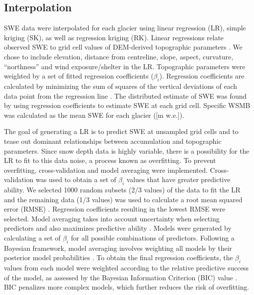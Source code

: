 \documentclass[twocolumn,letterpaper]{igs}
\begin{document}
\subsection{Interpolation}

SWE data were interpolated for each glacier using linear regression (LR), simple kriging (SK), as well as regression kriging (RK). Linear regressions relate observed SWE to grid cell values of DEM-derived topographic parameters \citep{Davis1986}. We chose to include elevation, distance from centreline, slope, aspect, curvature, ``northness'' and wind exposure/shelter in the LR. Topographic parameters were weighted by a set of fitted regression coefficients ($\beta_i$). Regression coefficients are calculated by minimizing the sum of squares of the vertical deviations of each data point from the regression line \citep{Davis1986}. The distributed estimate of SWE was found by using regression coefficients to estimate SWE at each grid cell. Specific WSMB was calculated as the mean SWE for each glacier ([m w.e.]). 

The goal of generating a LR is to predict SWE at unsampled grid cells and to tease out dominant relationships between accumulation and topographic parameters. Since snow depth data is highly variable, there is a possibility for the LR to fit to this data noise, a process known as overfitting. To prevent overfitting, cross-validation and model averaging were implemented. Cross-validation was used to obtain a set of $\beta_i$ values that have greater predictive ability. We selected 1000 random subsets (2/3 values) of the data to fit the LR and the remaining data (1/3 values) was used to calculate a root mean squared error (RMSE) \citep{Kohavi1995}. Regression coefficients resulting in the lowest RMSE were selected. Model averaging takes into account uncertainty when selecting predictors and also maximizes predictive ability \citep{Madigan1994}. Models were generated by calculating a set of $\beta_i$ for all possible combinations of predictors. Following a Bayesian framework, model averaging involves weighting all models by their posterior model probabilities \citep{Raftery1997}. To obtain the final regression coefficients, the $\beta_i$ values from each model were weighted according to the relative predictive success of the model, as assessed by the Bayesian Information Criterion (BIC) value \citep{Burnham2004}. BIC penalizes more complex models, which further reduces the risk of overfitting.
\end{document}
